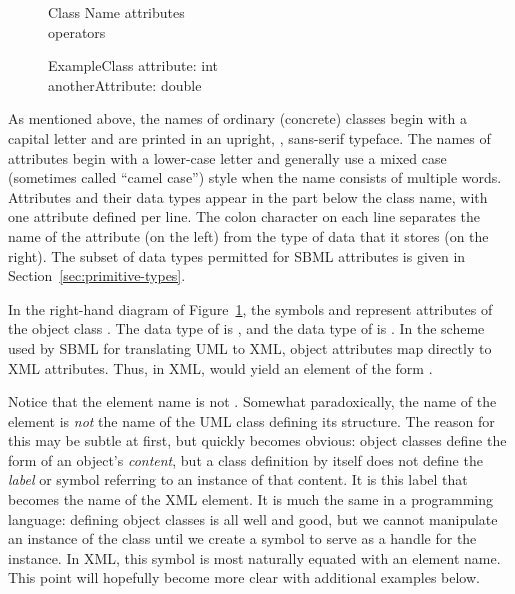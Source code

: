 \begin{blockChanged}
\begin{figure}[htb]
  \centering
  \small
  \begin{blockChanged}
    \begin{classbox}{Class Name}
      attributes\\
      \hline
      operators\\
    \end{classbox}
    \quad  \quad  \quad  \quad
    \begin{classbox}{ExampleClass}
      attribute: int \\
      anotherAttribute: double\\
    \end{classbox}
  \end{blockChanged}
  \caption{}
  \label{fig:simple-class-eg}
\end{figure}

As mentioned above, the names of ordinary (concrete) classes begin
with a capital letter and are printed in an upright,
, sans-serif typeface.  The names of attributes
begin with a lower-case letter and generally use a mixed case
(sometimes called ``camel case'') style when the name consists of
multiple words.  Attributes and their data types appear in the
part below the class name, with one attribute defined per line.
The colon character on each line separates the name of the
attribute (on the left) from the type of data that it stores (on
the right).  The subset of data types permitted for SBML
attributes is given in Section~\ref{sec:primitive-types}.

In the right-hand diagram of Figure~\ref{fig:simple-class-eg}, the
symbols  and  represent
attributes of the object class .  The data
type of  is , and the data type of
 is .  In the scheme used
by SBML for translating UML to XML, object attributes map directly
to XML attributes.  Thus, in XML,  would yield
an element of the form .

Notice that the element name is not .
Somewhat paradoxically, the name of the element is \emph{not} the
name of the UML class defining its structure.  The reason for this
may be subtle at first, but quickly becomes obvious: object
classes define the form of an object's \emph{content}, but a class
definition by itself does not define the \emph{label} or symbol
referring to an instance of that content.  It is this label that
becomes the name of the XML element.  It is much the same in a
programming language: defining object classes is all well and
good, but we cannot manipulate an instance of the class until we
create a symbol to serve as a handle for the instance.  In XML,
this symbol is most naturally equated with an element name.  This
point will hopefully become more clear with additional examples
below.



\end{blockChanged}
